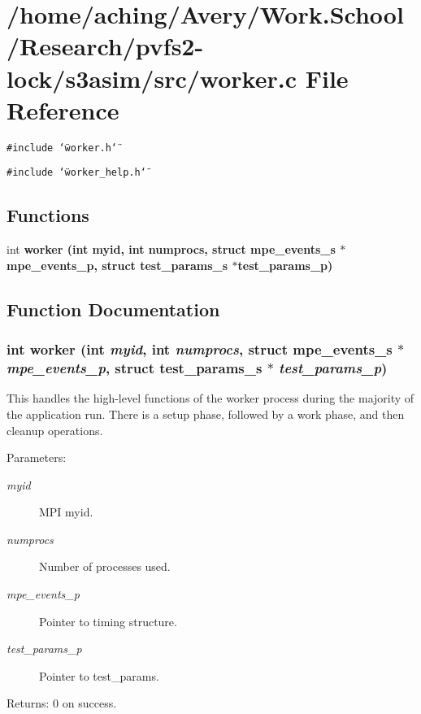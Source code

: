 \section{/home/aching/Avery/Work.School/Research/pvfs2-lock/s3asim/src/worker.c File Reference}
\label{worker_8c}
{\tt \#include \char`\"{}worker.h\char`\"{}}\par
{\tt \#include \char`\"{}worker\_\-help.h\char`\"{}}\par
\subsection*{Functions}
\begin{CompactItemize}
\item 
int \bf{worker} (int myid, int numprocs, struct \bf{mpe\_\-events\_\-s} $\ast$mpe\_\-events\_\-p, struct \bf{test\_\-params\_\-s} $\ast$test\_\-params\_\-p)
\end{CompactItemize}


\subsection{Function Documentation}
\subsubsection{\setlength{\rightskip}{0pt plus 5cm}int worker (int {\em myid}, int {\em numprocs}, struct \bf{mpe\_\-events\_\-s} $\ast$ {\em mpe\_\-events\_\-p}, struct \bf{test\_\-params\_\-s} $\ast$ {\em test\_\-params\_\-p})}\label{worker_8c_015e5ab7dd7d165f8b2d73d73e3a1a41}


This handles the high-level functions of the worker process during the majority of the application run. There is a setup phase, followed by a work phase, and then cleanup operations.

\begin{Desc}
\item[Parameters:]
\begin{description}
\item[{\em myid}]MPI myid. \item[{\em numprocs}]Number of processes used. \item[{\em mpe\_\-events\_\-p}]Pointer to timing structure. \item[{\em test\_\-params\_\-p}]Pointer to test\_\-params. \end{description}
\end{Desc}
\begin{Desc}
\item[Returns:]0 on success. \end{Desc}
